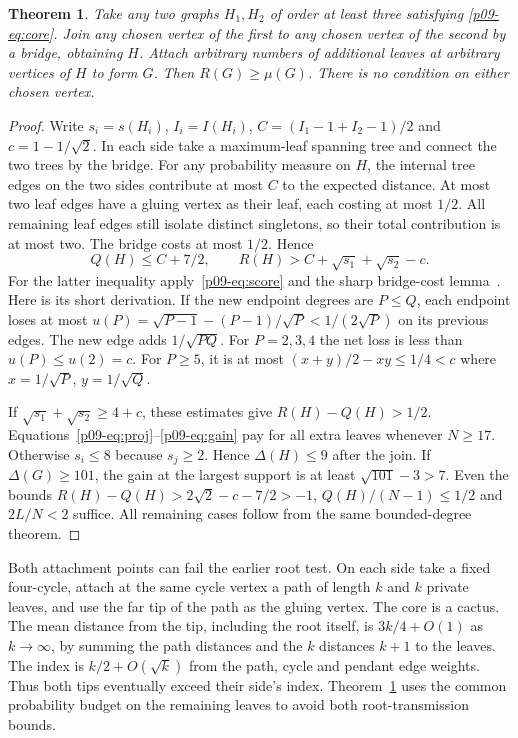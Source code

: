 \documentclass[11pt,a4paper]{article}
\newtheorem{theorem}{Theorem}[section]
\begin{document}
\begin{theorem}\label{p09-th:two}
Take any two graphs $H_1,H_2$ of order at least three satisfying
\eqref{p09-eq:core}. Join any chosen vertex of the first to any chosen vertex
of the second by a bridge, obtaining $H$. Attach arbitrary numbers of
additional leaves at arbitrary vertices of $H$ to form $G$. Then
$R(G)\ge\mu(G)$. There is no condition on either chosen vertex.
\end{theorem}
\begin{proof}
Write $s_i=s(H_i)$, $I_i=I(H_i)$,
$C=(I_1-1+I_2-1)/2$ and $c=1-1/\sqrt2$. In each side take a
maximum-leaf spanning tree and connect the two trees by the bridge.
For any probability measure on $H$, the internal tree edges on the two
sides contribute at most $C$ to the expected distance. At most two leaf
edges have a gluing vertex as their leaf, each costing at most $1/2$.
All remaining leaf edges still isolate distinct singletons, so their
total contribution is at most two. The bridge costs at most $1/2$. Hence
\[
 Q(H)\le C+7/2,\qquad
 R(H)>C+\sqrt{s_1}+\sqrt{s_2}-c .
\]
For the latter inequality apply~\eqref{p09-eq:score} and the sharp
bridge-cost lemma~\cite[Lemma 3.1]{p09-Prev}. Here is its short derivation.
If the new endpoint degrees are $P\le Q$, each endpoint loses at most
$u(P)=\sqrt{P-1}-(P-1)/\sqrt P<1/(2\sqrt P)$ on its previous edges.
The new edge adds $1/\sqrt{PQ}$. For $P=2,3,4$ the net loss is
less than $u(P)\le u(2)=c$. For $P\ge5$, it is at most
$(x+y)/2-xy\le1/4<c$ where $x=1/\sqrt P$, $y=1/\sqrt Q$.

If $\sqrt{s_1}+\sqrt{s_2}\ge4+c$, these estimates give
$R(H)-Q(H)>1/2$. Equations~\eqref{p09-eq:proj}--\eqref{p09-eq:gain} pay
for all extra leaves whenever $N\ge17$. Otherwise $s_i\le8$
because $s_j\ge2$. Hence $\Delta(H)\le9$ after the join.
If $\Delta(G)\ge101$, the gain at the largest support is at least
$\sqrt{101}-3>7$. Even the bounds $R(H)-Q(H)>2\sqrt2-c-7/2>-1$,
$Q(H)/(N-1)\le1/2$ and $2L/N<2$ suffice. All remaining cases follow
from the same bounded-degree theorem.
\end{proof}

Both attachment points can fail the earlier root test. On each side take
a fixed four-cycle, attach at the same cycle vertex a path of length $k$ and
$k$ private leaves, and use the far tip of the path as the gluing vertex.
The core is a cactus. The mean distance from the tip, including the root
itself, is $3k/4+O(1)$ as $k\to\infty$, by summing the path distances
and the $k$ distances $k+1$ to the leaves. The index is
$k/2+O(\sqrt k)$ from the path, cycle and pendant edge weights. Thus both
tips eventually exceed their side's index. Theorem~\ref{p09-th:two} uses
the common probability budget on the remaining leaves to avoid both
root-transmission bounds.
\end{document}
